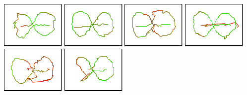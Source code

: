 \documentclass[lualatex,aspectratio=169,xcolor=dvipsnames,10pt,c]{beamer}
\begin{document}
{	\includegraphics[width=.15\textwidth]{breugel_babel-traj} \hfill
	\includegraphics[width=.15\textwidth]{van-gogh_starry-night-traj} \hfill
	\includegraphics[width=.15\textwidth]{kandinsky_comp-8-traj} \hfill
	\includegraphics[width=.15\textwidth]{vermeer_girl-pearl-traj} \hfill
	\includegraphics[width=.15\textwidth]{babar-traj} \hfill
	\includegraphics[width=.15\textwidth]{child-drawing_tooth-fairy-traj}

	\vspace{.7em}

}
\end{document}
